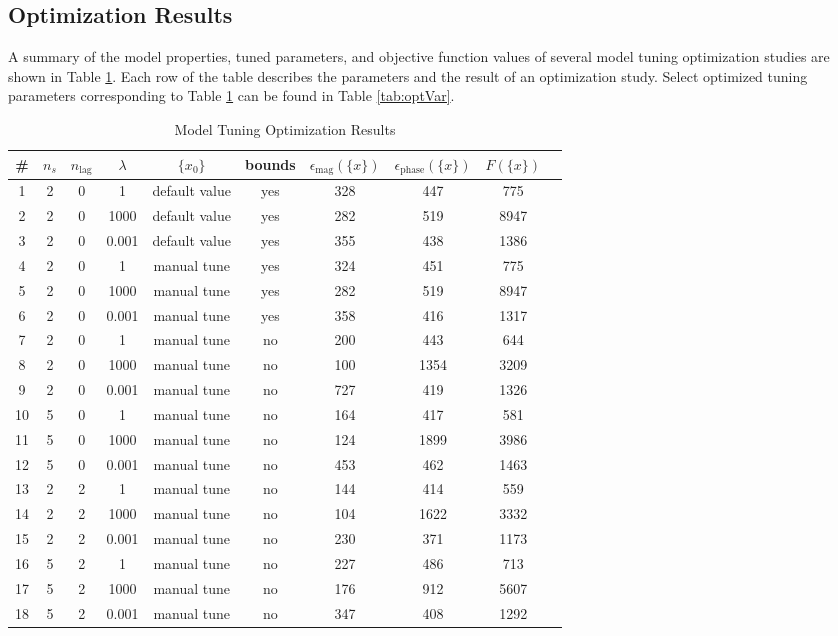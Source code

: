 \subsection{Optimization Results} %

A summary of the model properties, tuned parameters, and objective function values of several model tuning optimization studies are shown in Table \ref{tab:optResult}. Each row of the table describes the parameters and the result of an optimization study. Select optimized tuning parameters corresponding to Table \ref{tab:optResult} can be found in Table \ref{tab:optVar}.

\begin{landscape}

\begin{table}[H]
	\centering
	\caption{Model Tuning Optimization Results}
	\label{tab:optResult}
	\begin{tabular}{cccccccccc}
		\hline\hline
		\# & $n_s$ & $n_\text{lag}$ & $\lambda$ & $\{x_0\}$ & bounds & $\epsilon_\text{mag}(\{x\})$ & $\epsilon_\text{phase}(\{x\})$ & $F(\{x\})$ \\
		\hline
		1  & 2 & 0 & 1    & default value & yes & 328 & 447  & 775 \\
		2  & 2 & 0 & 1000  & default value & yes & 282 & 519  & 8947 \\
		3  & 2 & 0 & 0.001 & default value & yes & 355 & 438  & 1386 \\
		4  & 2 & 0 & 1    & manual tune   & yes & 324 & 451  & 775 \\
		5  & 2 & 0 & 1000  & manual tune   & yes & 282 & 519  & 8947 \\
		6  & 2 & 0 & 0.001 & manual tune   & yes & 358 & 416  & 1317 \\
		7  & 2 & 0 & 1    & manual tune   & no  & 200 & 443  & 644 \\
		8  & 2 & 0 & 1000  & manual tune   & no  & 100 & 1354 & 3209 \\
		9  & 2 & 0 & 0.001 & manual tune   & no  & 727 & 419  & 1326 \\
		10 & 5 & 0 & 1    & manual tune   & no  & 164 & 417  & 581 \\
		11 & 5 & 0 & 1000  & manual tune   & no  & 124 & 1899 & 3986 \\
		12 & 5 & 0 & 0.001 & manual tune   & no  & 453 & 462  & 1463 \\
		13 & 2 & 2 & 1    & manual tune   & no  & 144 & 414  & 559 \\
		14 & 2 & 2 & 1000  & manual tune   & no  & 104 & 1622 & 3332 \\
		15 & 2 & 2 & 0.001 & manual tune   & no  & 230 & 371  & 1173 \\
		16 & 5 & 2 & 1    & manual tune   & no  & 227 & 486  & 713 \\
		17 & 5 & 2 & 1000  & manual tune   & no  & 176 & 912  & 5607 \\
		18 & 5 & 2 & 0.001 & manual tune   & no  & 347 & 408  & 1292 \\
		\hline\hline
	\end{tabular}
\end{table}


\end{landscape}
